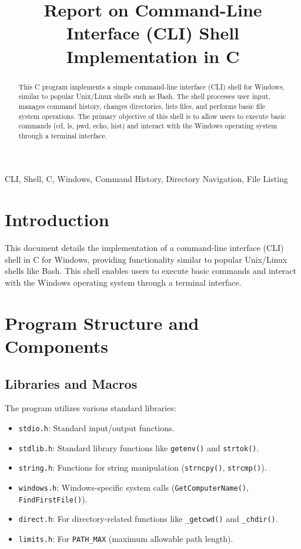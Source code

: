 \documentclass[conference]{IEEEtran}
\title{Report on Command-Line Interface (CLI) Shell Implementation in C}
\author{\IEEEauthorblockN{Your Name}
\IEEEauthorblockA{Your Institution\\
Your Email}
}
\begin{document}
\maketitle

\begin{abstract}
    This C program implements a simple command-line interface (CLI) shell for Windows, similar to popular Unix/Linux shells such as Bash. The shell processes user input, manages command history, changes directories, lists files, and performs basic file system operations. The primary objective of this shell is to allow users to execute basic commands (cd, ls, pwd, echo, hist) and interact with the Windows operating system through a terminal interface.
\end{abstract}

\begin{IEEEkeywords}
    CLI, Shell, C, Windows, Command History, Directory Navigation, File Listing
\end{IEEEkeywords}

\section{Introduction}
This document details the implementation of a command-line interface (CLI) shell in C for Windows, providing functionality similar to popular Unix/Linux shells like Bash. This shell enables users to execute basic commands and interact with the Windows operating system through a terminal interface.

\section{Program Structure and Components}
\subsection{Libraries and Macros}
The program utilizes various standard libraries:

\begin{itemize}
\item \texttt{stdio.h}: Standard input/output functions.
\item \texttt{stdlib.h}: Standard library functions like \texttt{getenv()} and \texttt{strtok()}.
\item \texttt{string.h}: Functions for string manipulation (\texttt{strncpy()}, \texttt{strcmp()}).
\item \texttt{windows.h}: Windows-specific system calls (\texttt{GetComputerName()}, \texttt{FindFirstFile()}).
\item \texttt{direct.h}: For directory-related functions like \texttt{\_getcwd()} and \texttt{\_chdir()}.
\item \texttt{limits.h}: For \texttt{PATH\_MAX} (maximum allowable path length).
\end{itemize}
\end{document}
